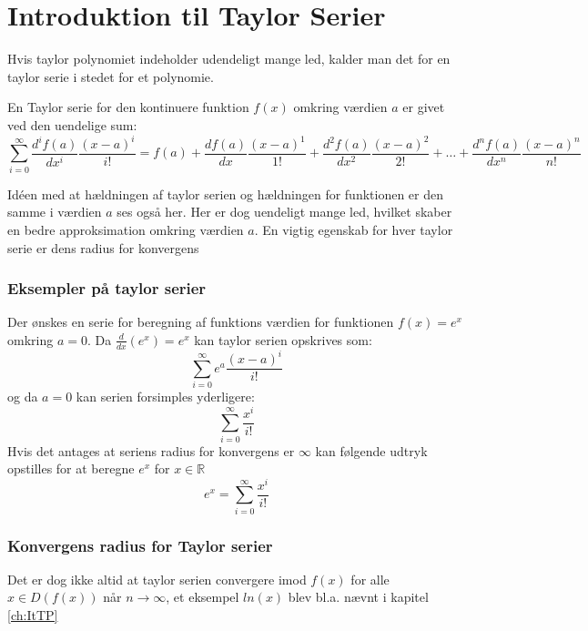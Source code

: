 \chapter{Introduktion til Taylor Serier}
Hvis taylor polynomiet indeholder udendeligt mange led, 
kalder man det for en taylor serie i stedet for et polynomie. 
\begin{defn}
    En Taylor serie for den kontinuere funktion $f(x)$ omkring værdien $a$ er givet ved den uendelige sum:
    \[
    \sum^{\infty}_{i=0} \frac{d^i f(a)}{dx^i} \frac{(x-a)^{i}}{i!} = f(a) + \frac{df(a)}{dx} \frac{(x-a)^{1}}{1!} + \frac{d^{2}f(a)}{dx^{2}} \frac{(x-a)^{2}}{2!} + \ldots + \frac{d^{n} f(a)}{dx^{n}} \frac{(x-a)^n}{n!}
    \]
\end{defn}
Idéen med at hældningen af taylor serien og hældningen for funktionen er den samme i værdien $a$ ses også her.
Her er dog uendeligt mange led, hvilket skaber en bedre approksimation omkring værdien $a$. 
En vigtig egenskab for hver taylor serie er dens radius for konvergens %
\label{def:taylorSerie}
\subsection*{Eksempler på taylor serier} 

Der ønskes en serie for beregning af funktions værdien for funktionen $f(x) = e^x$ omkring $a = 0$.
Da $\frac{d}{dx}(e^x) = e^x$ kan taylor serien opskrives som:
\[
\sum^\infty_{i = 0} e^a \frac{(x-a)^i}{i!}
\]
og da $a = 0$ kan serien forsimples yderligere:
\[
\sum^\infty_{i = 0} \frac{x^i}{i!}  
\]
Hvis det antages at seriens radius for konvergens er $\infty$ kan følgende udtryk opstilles for at beregne $e^x$ for $x \in \mathbb{R}$
\[
e^x = \sum^\infty_{i = 0} \frac{x^i}{i!}  
\]
\subsection*{Konvergens radius for Taylor serier} %
Det er dog ikke altid at taylor serien convergere imod $f(x)$ for alle $x \in D(f(x))$ når $n \rightarrow \infty$,
et eksempel $ln(x)$ blev bl.a. nævnt i kapitel \ref{ch:ItTP} 



